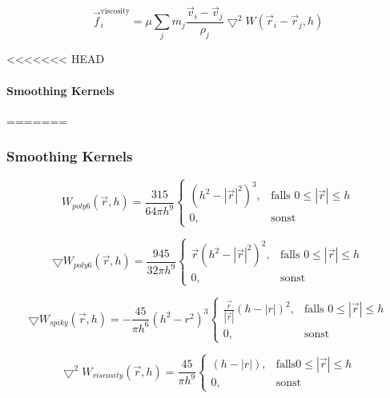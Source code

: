 \documentclass[a4paper]{paper}
\begin{document}
\begin{equation}
\label{force_viscosity}
\vec{f}^{\text{viscosity}}_{i} = \mu \sum_{j}m_{j}\frac{\vec{v}_{i} - \vec{v}_{j}}{\rho_{j}}\bigtriangledown^2 W(\vec{r}_{i}-\vec{r}_{j},h)
\end{equation}

<<<<<<< HEAD
\paragraph{Smoothing Kernels}

=======

\subsubsection{Smoothing Kernels}

\begin{equation}
\label{poly6}
W_{poly6}(\vec{r},h) = \frac{315}{64 \pi h^9} 
\begin{cases}
(h^2-|\vec{r}|^2)^3, & \text{falls } 0 \leq |\vec{r}| \leq h \\
0, & \text{sonst}
\end{cases}
\end{equation}

\begin{equation}
\label{gradient_poly6}
\bigtriangledown W_{poly6}(\vec{r},h) = \frac{945}{32 \pi h^9} 
\begin{cases}
\vec{r}(h^2-|\vec{r}|^2)^2, &\text{falls } 0 \leq |\vec{r}| \leq h  \\
0, & \text{sonst}
\end{cases}
\end{equation}

\begin{equation}
\label{spiky}
\bigtriangledown W_{spiky}(\vec{r},h) = -\frac{45}{\pi h^6} (h^2-r^2)^3
\begin{cases}
\frac{\vec{r}}{|\vec{r}|}(h-|r|)^2, & \text{falls } 0 \leq |\vec{r}| \leq h\\
0, & \text{sonst}
\end{cases}
\end{equation}

\begin{equation}
\label{viscosity}
\bigtriangledown^2 W_{viscosity}(\vec{r},h) = \frac{45}{\pi h^9} 
\begin{cases}
(h-|r|),& \text{falls} 0 \leq |\vec{r}| \leq h \\
0, & \text{sonst}
\end{cases}
\end{equation}
\end{document}
